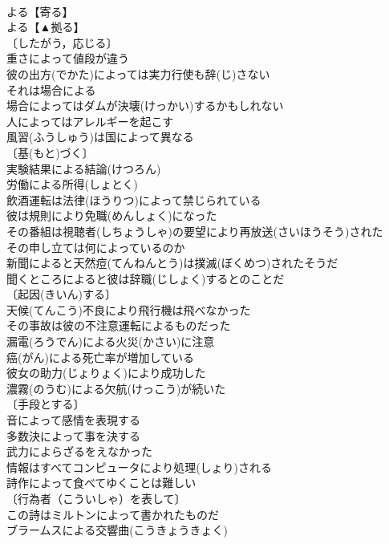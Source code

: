 \documentclass[8pt]{extreport}
\begin{document}
\begin{CJK}{UTF8}{min}
\\	よる【寄る】 
\\	よる【▲拠る】 
\\	〔したがう，応じる〕
\\	重さによって値段が違う 
\\	彼の出方(でかた)によっては実力行使も辞(じ)さない 
\\	それは場合による 
\\	場合によってはダムが決壊(けっかい)するかもしれない 
\\	人によってはアレルギーを起こす 
\\	風習(ふうしゅう)は国によって異なる 
\\	〔基(もと)づく〕
\\	実験結果による結論(けつろん) 
\\	労働による所得(しょとく) 
\\	飲酒運転は法律(ほうりつ)によって禁じられている 
\\	彼は規則により免職(めんしょく)になった 
\\	その番組は視聴者(しちょうしゃ)の要望により再放送(さいほうそう)された 
\\	その申し立ては何によっているのか 
\\	新聞によると天然痘(てんねんとう)は撲滅(ぼくめつ)されたそうだ 
\\	聞くところによると彼は辞職(じしょく)するとのことだ 
\\	〔起因(きいん)する〕
\\	天候(てんこう)不良により飛行機は飛べなかった 
\\	その事故は彼の不注意運転によるものだった 
\\	漏電(ろうでん)による火災(かさい)に注意 
\\	癌(がん)による死亡率が増加している 
\\	彼女の助力(じょりょく)により成功した 
\\	濃霧(のうむ)による欠航(けっこう)が続いた 
\\	〔手段とする〕
\\	音によって感情を表現する 
\\	多数決によって事を決する 
\\	武力によらざるをえなかった 
\\	情報はすべてコンピュータにより処理(しょり)される 
\\	詩作によって食べてゆくことは難しい 
\\	〔行為者（こういしゃ）を表して〕
\\	この詩はミルトンによって書かれたものだ 
\\	ブラームスによる交響曲(こうきょうきょく) 

\end{CJK}
\end{document}

